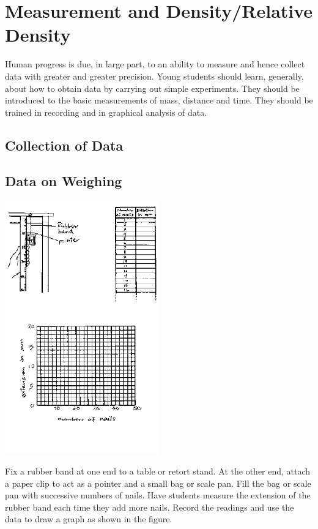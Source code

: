 \section{Measurement and Density/Relative Density}

Human progress is due, in large part, to an ability to measure and hence collect data with
greater and greater precision. Young students should learn, generally, about how to obtain data
by carrying out simple experiments. They should be introduced to the basic measurements of
mass, distance and time. They should be trained in recording and in graphical analysis of
data.

\begin{multicols}{2}

\section*{Collection of Data}


\subsection{Data on Weighing}

\begin{center}
\includegraphics[width=0.5\textwidth]{./img/source/meas-mass.png}
\end{center}

Fix a rubber band at one end to a table or retort stand. At the other end, attach a paper clip to act as a pointer and a small bag or scale pan. Fill the bag or scale pan with successive numbers of nails. Have students measure the extension of the rubber band each time they add more nails. Record the readings and use the data to draw a graph as shown in the figure.


\end{multicols}
